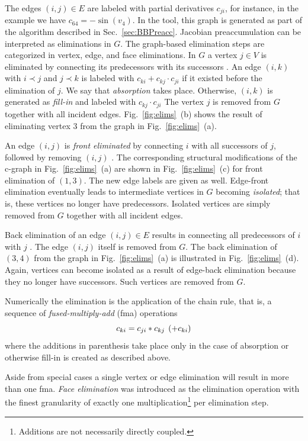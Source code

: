 \documentclass{book}
\newcommand{\refsec}[1]{{Sec.~\ref{#1}}}
\newcommand{\reffig}[1]{{Fig.~\ref{#1}}}
\begin{document}
The edges $(i,j)\in E$ are labeled with partial derivatives
$c_{ji}$, for instance, in the 
example we have $c_{64}=-\sin(v_4)$.
In the tool, this graph is generated as part of the algorithm described in 
\refsec{sec:BBPreacc}.
Jacobian preaccumulation can be interpreted as eliminations in $G$.
The graph-based elimination steps are categorized in vertex, edge, and face 
eliminations. 
In $G$ a vertex $j \in V$ is eliminated by connecting its predecessors with
its successors \cite{Griewank1991OtC}.
An edge $(i,k)$ with
$i \prec j$ and $j \prec k$ is labeled with
$c_{ki}+c_{kj} \cdot c_{ji}$ if it existed before the elimination of $j.$
We say that {\em absorption} takes place.
Otherwise, $(i,k)$ is generated as {\em fill-in} and labeled
with $c_{kj} \cdot c_{ji}$
The vertex $j$ is removed from
$G$ together with all incident edges. 
\reffig{fig:elims}~(b) shows the result of eliminating vertex $3$
from the graph in \reffig{fig:elims}~(a).

An edge $(i,j)$ is {\em front eliminated} by connecting $i$ with all successors
of $j$, followed by removing $(i,j)$ \cite{Naumann2002ETf}.
The corresponding structural modifications of the c-graph in
\reffig{fig:elims}~(a) are shown in
\reffig{fig:elims}~(c) for front elimination of $(1,3).$
The new edge labels are given as well.
Edge-front elimination eventually leads to intermediate vertices in $G$
becoming
{\em isolated}; that is, these vertices no longer have predecessors.
Isolated vertices are simply removed from $G$ together
with all incident edges.

Back elimination of an edge
$(i,j) \in E$ results in connecting all predecessors of $i$
with $j$ \cite{Naumann2002ETf}.
The edge $(i,j)$ itself is removed from $G.$
The back elimination of $(3,4)$ from the graph in \reffig{fig:elims}~(a) 
is illustrated in \reffig{fig:elims}~(d). 
Again, vertices can become isolated as a result of edge-back elimination
because they no longer have successors.
Such vertices are removed from $G.$

Numerically the elimination is the application of 
the chain rule, that is, a sequence of {\em fused-multiply-add} (fma) operations
\begin{equation}\label{eqn:fma}
  c_{ki}=c_{ji}*c_{kj}\hspace*{1ex}(+c_{ki}) 
\end{equation}
where the additions in parenthesis take place only  in the case of 
absorption or otherwise fill-in is created 
as described above.

Aside from special cases a single vertex or edge elimination will result in more
than one fma. {\em Face elimination} was introduced 
as the elimination operation with the finest granularity of exactly 
one multiplication\footnote{Additions are not necessarily directly coupled.} 
per elimination step.
\end{document}
